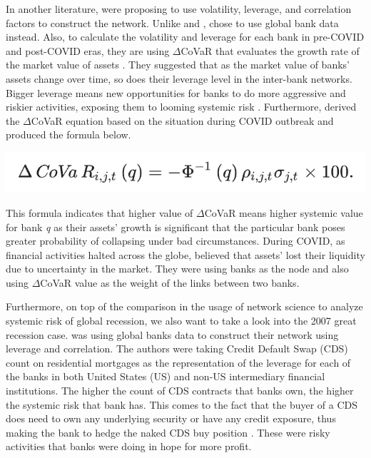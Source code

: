 \documentclass[a4paper,11pt]{article}
\begin{document}
In another literature, \cite{Duan_El_Ghoul_Guedhami_Li_Li_2020} were proposing to use volatility, leverage, and correlation factors to construct the network. Unlike \cite{Lai_Hu_2021} and \cite{Zhang_Yin_Sha_2023}, \cite{Duan_El_Ghoul_Guedhami_Li_Li_2020} chose to use global bank data instead. Also, to calculate the volatility and leverage for each bank in pre-COVID and post-COVID eras, they are using $\Delta$CoVaR that evaluates the growth rate of the market value of assets \citep{Adrian_Brunnermeier_2016}. They suggested that as the market value of banks’ assets change over time, so does their leverage level in the inter-bank networks. Bigger leverage means new opportunities for banks to do more aggressive and riskier activities, exposing them to looming systemic risk \cite{Adrian_Brunnermeier_2009}. Furthermore, \cite{Duan_El_Ghoul_Guedhami_Li_Li_2020} derived the $\Delta$CoVaR equation based on the situation during COVID outbreak and produced the formula below.

\includegraphics[scale=0.7]{covar.png}

This formula indicates that higher value of $\Delta$CoVaR means higher systemic value for bank \textit{q} as their assets’ growth is significant that the particular bank poses greater probability of collapsing under bad circumstances. During COVID, as financial activities halted across the globe, \cite{Duan_El_Ghoul_Guedhami_Li_Li_2020} believed that assets’ lost their liquidity due to uncertainty in the market. They were using banks as the node and also using $\Delta$CoVaR value as the weight of the links between two banks.

Furthermore, on top of the comparison in the usage of network science to analyze systemic risk of global recession, we also want to take a look into the 2007 great recession case. \cite{Markose_Giansante_Shaghaghi_2012} was using global banks data to construct their network using leverage and correlation. The authors were taking Credit Default Swap (CDS) count on residential mortgages as the representation of the leverage for each of the banks in both United States (US) and non-US intermediary financial institutions. The higher the count of CDS contracts that banks own, the higher the systemic risk that bank has. This comes to the fact that the buyer of a CDS does need to own any underlying security or have any credit exposure, thus making the bank to hedge the naked CDS buy position \citep{Markose_Giansante_Shaghaghi_2012}. These were risky activities that banks were doing in hope for more profit.
\end{document}

